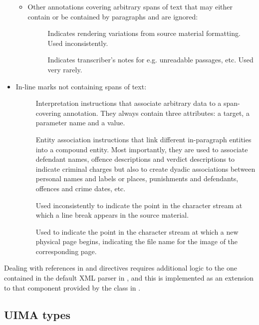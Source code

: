 \begin{itemize}
\begin{itemize}
        \item Other annotations covering arbitrary spans of text that may either contain or be contained by paragraphs and are ignored:
        \begin{description}
            \item []
            Indicates rendering variations from source material formatting. Used inconsistently.
            \item []
            Indicates transcriber's notes for e.g. unreadable passages, etc. Used very rarely.
        \end{description}
    \end{itemize}
    \item In-line marks not containing spans of text:
    \begin{description}
        \item []
        Interpretation instructions that associate arbitrary data to a span-covering annotation.
        They always contain three attributes: a target, a parameter name and a value.
        \item []
        Entity association instructions that link different in-paragraph entities into a compound entity.
        Most importantly, they are used to associate defendant names, offence descriptions and verdict descriptions to indicate criminal charges but also to create dyadic associations between personal names and labels or places, punishments and defendants, offences and crime dates, etc.
        \item []
        Used inconsistently to indicate the point in the character stream at which a line break appears in the source material.
        \item []
        Used to indicate the point in the character stream at which a new physical page begins, indicating the file name for the image of the corresponding page.
    \end{description}
\end{itemize}

Dealing with references in  and  directives requires additional logic to the one contained in the default XML parser in , and this is implemented as an extension to that component provided by the  class in .

\subsection{UIMA types}

